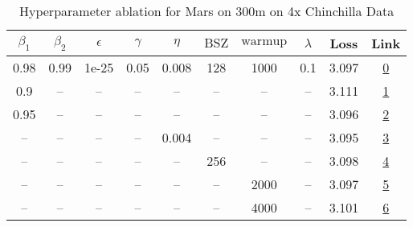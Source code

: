 \begin{table}[H]
\centering
\caption{Hyperparameter ablation for Mars on 300m on 4x Chinchilla Data}
\label{tab:ablation_mars_300m_4}
\begin{tabular}{cccccccccc}
\toprule
$\beta_1$ & $\beta_2$ & $\epsilon$ & $\gamma$ & $\eta$ & $\mathrm{BSZ}$ & $\mathrm{warmup}$ & $\lambda$ & Loss & Link \\
\midrule
0.98 & 0.99 & 1e-25 & 0.05 & 0.008 & 128 & 1000 & 0.1 & 3.097 & \href{https://wandb.ai/stanford-mercury/optimizer-scaling/runs/sweep-300m-24B-mars3a0394lr0.008-wd0.1-minlr0-warmup1000-b10.98--79e319}{0} \\
\midrule
0.9 & -- & -- & -- & -- & -- & -- & -- & 3.111 & \href{https://wandb.ai/stanford-mercury/optimizer-scaling/runs/sweep-300m-24B-mars4adeb3lr0.008-wd0.1-minlr0-warmup1000-b10.9-b-56d9fa}{1} \\
0.95 & -- & -- & -- & -- & -- & -- & -- & 3.096 & \href{https://wandb.ai/stanford-mercury/optimizer-scaling/runs/sweep-300m-24B-mars0c24e7lr0.008-wd0.1-minlr0-warmup1000-b10.95--e508fb}{2} \\
-- & -- & -- & -- & 0.004 & -- & -- & -- & 3.095 & \href{https://wandb.ai/stanford-mercury/optimizer-scaling/runs/sweep-300m-24B-mars98645clr0.004-wd0.1-minlr0-warmup1000-b10.98--72b012}{3} \\
-- & -- & -- & -- & -- & 256 & -- & -- & 3.098 & \href{https://wandb.ai/stanford-mercury/optimizer-scaling/runs/sweep-300m-24B-marsbb066blr0.008-wd0.1-minlr0-warmup1000-b10.98--71162e}{4} \\
-- & -- & -- & -- & -- & -- & 2000 & -- & 3.097 & \href{https://wandb.ai/stanford-mercury/optimizer-scaling/runs/sweep-300m-24B-mars3f97e6lr0.008-wd0.1-minlr0-warmup2000-b10.98--d090a1}{5} \\
-- & -- & -- & -- & -- & -- & 4000 & -- & 3.101 & \href{https://wandb.ai/stanford-mercury/optimizer-scaling/runs/sweep-300m-24B-mars9edcd4lr0.008-wd0.1-minlr0-warmup4000-b10.98--b278a3}{6} \\
\bottomrule
\end{tabular}
\end{table}

